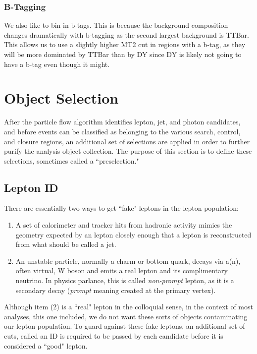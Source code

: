     \subsubsection{B-Tagging}
      We also like to bin in b-tags. This is because the background composition changes dramatically with b-tagging as the second largest background is TTBar. This allows us to use a slightly higher MT2 cut in regions with a b-tag, as they will be more dominated by TTBar than by DY since DY is likely not going to have a b-tag even though it might.

\section{Object Selection}


  After the particle flow algorithm identifies lepton, jet, and photon candidates, and before events can be classified as belonging to the various search, control, and closure regions, an additional set of selections are applied in order to further purify the analysis object collection. The purpose of this section is to define these selections, sometimes called a ``preselection."

  \subsection{Lepton ID}
    There are essentially two ways to get ``fake" leptons in the lepton population:

    \begin{enumerate}
      \item A set of calorimeter and tracker hits from hadronic activity mimics the geometry expected by an lepton closely enough that a lepton is reconstructed from what should be called a jet.
      \item An unstable particle, normally a charm or bottom quark, decays via a(n), often virtual, W boson and emits a real lepton and its complimentary neutrino. In physics parlance, this is called \emph{non-prompt} lepton, as it is a secondary decay (\emph{prompt} meaning created at the primary vertex).
    \end{enumerate}

    Although item (2) is a ``real" lepton in the colloquial sense, in the context of most analyses, this one included, we do not want these sorts of objects contaminating our lepton population. To guard against these fake leptons, an additional set of cuts, called an ID is required to be passed by each candidate before it is considered a ``good" lepton.

